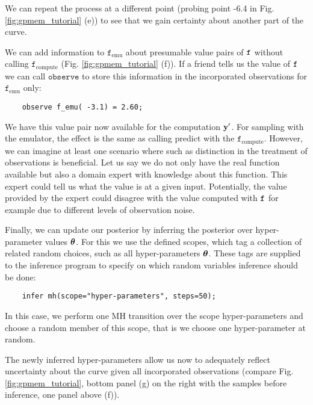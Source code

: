 We can repeat the process at a different point (probing point -6.4 in Fig.
\ref{fig:gpmem_tutorial} (e)) to see that we gain certainty about another part of the curve. 

We can add information to $\texttt{f}_\text{emu}$ about presumable value pairs of $\texttt{f}$ without calling $\texttt{f}_\text{compute}$
(Fig. \ref{fig:gpmem_tutorial} (f)).
If a friend tells us the value of $\texttt{f}$ we can call $\texttt{observe}$ to store this information in the incorporated observations for $\texttt{f}_\text{emu}$ only:
    \begin{lstlisting}
    observe f_emu( -3.1) = 2.60;
    \end{lstlisting}
We have this value pair now available for the computation $\mathbf{y}^\prime$. 
For sampling with the emulator, the effect is the same as calling predict with the $\texttt{f}_\text{compute}$.
However, we can imagine at least one scenario where such as distinction in the treatment of observations 
is beneficial. Let us say we do not only have the real function available but also a domain expert with knowledge 
about this function.
This expert could tell us what the value is at a given input.
Potentially, the value provided by the expert could disagree with the value computed with $\texttt{f}$ for example 
due to different levels of observation noise. 

Finally, we can update our posterior by inferring the posterior over hyper-parameter values $\bm{\theta}$.
For this we use the defined scopes, which tag a collection of related random choices, such
as all hyper-parameters $\bm{\theta}$.
These tags are supplied to the
inference program to specify on which random variables inference
should be done:
    \begin{lstlisting}
    infer mh(scope="hyper-parameters", steps=50);
    \end{lstlisting}
In this case, we perform one \ac{MH} transition over the scope hyper-parameters
and choose a random member of this scope, that is we choose one hyper-parameter at random.

The newly inferred hyper-parameters allow us now to adequately reflect uncertainty
about the curve given all incorporated observations (compare
Fig. \ref{fig:gpmem_tutorial}, bottom panel (g) on  the right with the samples
before inference, one panel above (f)).

